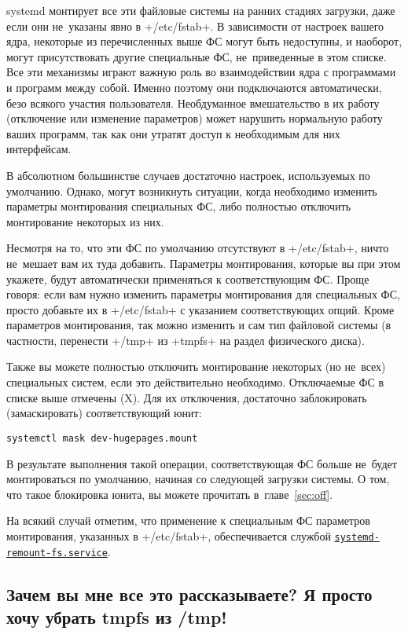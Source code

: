 \documentclass[10pt,oneside,a4paper]{article}
\newcommand{\hreftt}[2]{\href{#1}{\texttt{#2}}}
\begin{document}
systemd монтирует все эти файловые системы на ранних стадиях загрузки, даже если
они не~указаны явно в +/etc/fstab+. В зависимости от настроек вашего ядра,
некоторые из перечисленных выше ФС могут быть недоступны, и наоборот, могут
присутствовать другие специальные ФС, не~приведенные в этом списке. Все эти
механизмы играют важную роль во взаимодействии ядра с программами и программ
между собой. Именно поэтому они подключаются автоматически, безо всякого участия
пользователя. Необдуманное вмешательство в их работу (отключение или изменение
параметров) может нарушить нормальную работу ваших программ, так как они утратят
доступ к необходимым для них интерфейсам.

В абсолютном большинстве случаев достаточно настроек, используемых по умолчанию.
Однако, могут возникнуть ситуации, когда необходимо изменить параметры
монтирования специальных ФС, либо полностью отключить монтирование некоторых из
них.

Несмотря на то, что эти ФС по умолчанию отсутствуют в +/etc/fstab+, ничто
не~мешает вам их туда добавить. Параметры монтирования, которые вы при этом
укажете, будут автоматически применяться к соответствующим ФС. Проще говоря:
если вам нужно изменить параметры монтирования для специальных ФС, просто
добавьте их в +/etc/fstab+ с указанием соответствующих опций. Кроме параметров
монтирования, так можно изменить и сам тип файловой системы (в частности,
перенести +/tmp+ из +tmpfs+ на раздел физического диска).

Также вы можете полностью отключить монтирование некоторых (но не~всех)
специальных систем, если это действительно необходимо. Отключаемые ФС в списке
выше отмечены (X). Для их отключения, достаточно заблокировать (замаскировать)
соответствующий юнит:
\begin{Verbatim}
systemctl mask dev-hugepages.mount
\end{Verbatim}

В результате выполнения такой операции, соответствующая ФС больше не~будет
монтироваться по умолчанию, начиная со следующей загрузки системы. О том, что
такое блокировка юнита, вы можете прочитать в~главе~\ref{sec:off}.

На всякий случай отметим, что применение к специальным ФС параметров монтирования,
указанных в +/etc/fstab+, обеспечивается службой
\hreftt{http://www.freedesktop.org/software/systemd/man/systemd-remount-fs.service.html}%
{systemd-remount-fs.service}.

\subsection*{Зачем вы мне все это рассказываете? Я просто хочу убрать tmpfs из
/tmp!}
\end{document}
